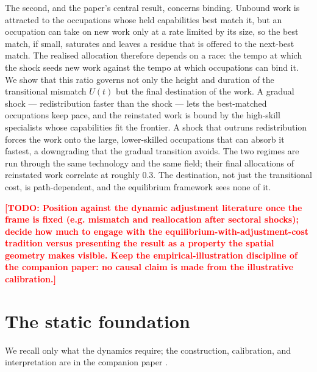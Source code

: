 \documentclass[12pt, a4paper]{article}
\newcommand{\todo}[1]{\textcolor{red}{\textbf{[TODO: #1]}}}
\begin{document}
The second, and the paper's central result, concerns binding. Unbound
work is attracted to the occupations whose held capabilities best match
it, but an occupation can take on new work only at a rate limited by its
size, so the best match, if small, saturates and leaves a residue that is
offered to the next-best match. The realised allocation therefore depends
on a race: the tempo at which the shock seeds new work against the tempo
at which occupations can bind it. We show that this ratio governs not
only the height and duration of the transitional mismatch $U(t)$ but the
final destination of the work. A gradual shock --- redistribution faster
than the shock --- lets the best-matched occupations keep pace, and the
reinstated work is bound by the high-skill specialists whose capabilities
fit the frontier. A shock that outruns redistribution forces the work
onto the large, lower-skilled occupations that can absorb it fastest, a
downgrading that the gradual transition avoids. The two regimes are run
through the same technology and the same field; their final allocations
of reinstated work correlate at roughly $0.3$. The destination, not just
the transitional cost, is path-dependent, and the equilibrium framework
sees none of it.

\todo{Position against the dynamic adjustment literature once the frame
is fixed (e.g. mismatch and reallocation after sectoral shocks); decide
how much to engage with the equilibrium-with-adjustment-cost tradition
versus presenting the result as a property the spatial geometry makes
visible. Keep the empirical-illustration discipline of the companion
paper: no causal claim is made from the illustrative calibration.}

\section{The static foundation}
\label{sec:foundation}

We recall only what the dynamics require; the construction, calibration,
and interpretation are in the companion paper
\parencite{storck2026fields}.
\end{document}
